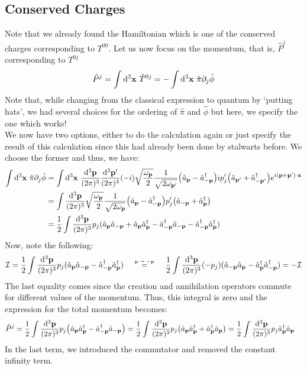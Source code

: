 \subsection{Conserved Charges}
Note that we already found the Hamiltonian which is one of the conserved charges corresponding to $T^{00}$. Let us now focus on the momentum, that is, $\hat{P}^j$ corresponding to $T^{0j}$
$$\hat{P}^j = \int \dd^3\vb{x} \ \hat{T}^{0j} = -\int \dd^3\vb{x}\ \hat{\pi} \partial_j \hat{\phi}$$
Note that, while changing from the classical expression to quantum by `putting hats', we had several choices for the ordering of $\hat{\pi}$ and $\hat{\phi}$ but here, we specify the one which works!\\[0.2cm]
We now have two options, either to do the calculation again or just specify the result of this calculation since this had already been done by stalwarts before. We choose the former and thus, we have:
\begin{align*}
   \int \dd^3\vb{x}\ \hat{\pi} \partial_j \hat{\phi} &=  \int \dd^3\vb{x}\  \frac{\dd^3\vb{{\vb{\vb{p}}}}}{(2\pi)^3}\frac{\dd^3\vb{{\vb{\vb{p}'}}}}{(2\pi)^3} (-i)\sqrt{\frac{\omega_{\vb{{p}}}}{2}}\frac{1}{\sqrt{2\omega_{\vb{{p}}'}}} \qty(\hat{a}_{\vb{p}}-\hat{a}_{\vb{-p}}^\dagger) ip'_j  \qty(\hat{a}_{\vb{p}'}+\hat{a}_{\vb{-p}'}^\dagger) e^{i (\vb{p}+\vb{p}')\cdot\vb{x}}\\
   &=\int \frac{\dd^3\vb{{\vb{\vb{p}}}}}{(2\pi)^3} \sqrt{\frac{\omega_{\vb{{p}}}}{2}}\frac{1}{\sqrt{2\omega_{\vb{{p}}}}} \qty(\hat{a}_{\vb{p}}-\hat{a}_{\vb{-p}}^\dagger) p'_j  \qty(\hat{a}_{\vb{-p}}+\hat{a}_{\vb{p}}^\dagger)\\
   &= \frac{1}{2}\int \frac{\dd^3\vb{{\vb{\vb{p}}}}}{(2\pi)^3} p_j (\hat{a}_{\vb{p}}\hat{a}_{\vb{-p}} +\hat{a}_{\vb{p}}\hat{a}_{\vb{p}}^\dagger - \hat{a}_{\vb{-p}}^\dagger\hat{a}_{\vb{-p}}-\hat{a}_{\vb{-p}}^\dagger\hat{a}_{\vb{p}}^\dagger)
\end{align*}
Now, note the following:
\begin{align*}
  \mathcal{I} =  \frac{1}{2}\int \meas{\vb{\vb{p}}} p_j  (\annp\annmp -\cremp\crep) \qquad\myeq{$\vb{p}\rightarrow -\vb{p}$} \qquad \frac{1}{2}\int \meas{\vb{\vb{p}}} (-p_j)  (\annmp\annp -\crep\cremp) = - \mathcal{I}
\end{align*}
The last equality comes since the creation and annihilation operators commute for different values of the momentum. Thus, this integral is zero and the expression for the total momentum becomes:
\begin{align*}
    \hat{P}^j &=\frac{1}{2}\int \frac{\dd^3\vb{{\vb{\vb{p}}}}}{(2\pi)^3} p_j \qty(\hat{a}_{\vb{p}}\hat{a}_{\vb{p}}^\dagger -\hat{a}_{\vb{-p}}^\dagger\hat{a}_{\vb{-p}}) = \frac{1}{2}\int \frac{\dd^3\vb{{\vb{\vb{p}}}}}{(2\pi)^3} p_j \qty(\hat{a}_{\vb{p}}\hat{a}_{\vb{p}}^\dagger +\hat{a}_{\vb{p}}^\dagger\hat{a}_{\vb{p}}) = \frac{1}{2}\int \frac{\dd^3\vb{{\vb{\vb{p}}}}}{(2\pi)^3} p_j \hat{a}_{\vb{p}}^\dagger\hat{a}_{\vb{p}}
\end{align*}
In the last term, we introduced the commutator and removed the constant infinity term. 
